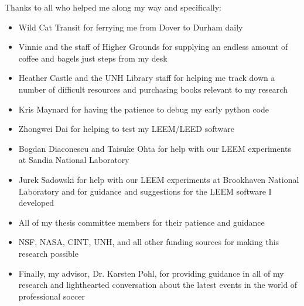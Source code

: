 \acknowledgments
\indent
\begin{center}
Thanks to all who helped me along my way and  specifically:
\end{center}
\begin{itemize}
\item Wild Cat Transit for ferrying me from Dover to Durham daily

\item Vinnie and the staff of Higher Grounds for supplying an endless amount of coffee and bagels just steps from my desk

\item Heather Castle and the UNH Library staff for helping me track down a number of difficult resources and purchasing books relevant to my research

\item Kris Maynard for having the patience to debug my early python code

\item Zhongwei Dai for helping to test my LEEM/LEED software

\item Bogdan Diaconescu and Taisuke Ohta for help with our LEEM experiments at Sandia National Laboratory

\item Jurek Sadowski for help with our LEEM experiments at Brookhaven National Laboratory and for guidance and suggestions for the LEEM software I developed

\item All of my thesis committee members for their patience and guidance

\item NSF, NASA, CINT, UNH, and all other funding sources for making this research possible

\item Finally, my advisor, Dr. Karsten Pohl, for providing guidance in all of my research and lighthearted conversation about the latest events in the world of professional soccer

\end{itemize}
\endacknowledgments

\setcounter{secnumdepth}{2} %
\setcounter{tocdepth}{3}  %
\tableofcontents
\listoffigures


